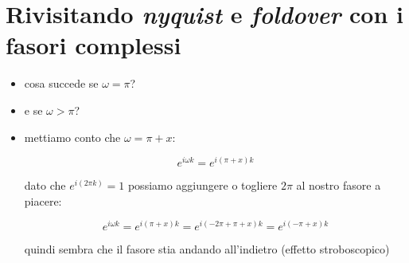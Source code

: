 \section{Rivisitando \emph{nyquist} e \emph{foldover} con i fasori complessi}

\begin{itemize}

	\item cosa succede se $\omega = \pi$?

  \item e se $\omega > \pi$?
	
	\item mettiamo conto che $\omega = \pi + x$:

		 \begin{equation}
        e^{i\omega k} = e^{i(\pi + x)k}
		 \end{equation}

  dato che $e^{i(2 \pi k)} = 1$ possiamo aggiungere o togliere $2\pi$ al nostro
  fasore a piacere:

		 \begin{equation}
       e^{i\omega k} = e^{i(\pi + x)k} = e^{i(-2\pi + \pi + x)k} = e^{i(-\pi + x)k}
		 \end{equation}

  quindi sembra che il fasore stia andando all'indietro (effetto stroboscopico)

\end{itemize}

